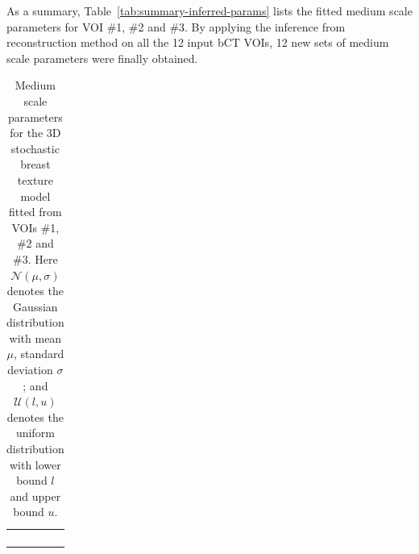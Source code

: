 \documentclass[journal]{IEEEtran}
\begin{document}
As a summary, Table~\ref{tab:summary-inferred-params} lists the fitted
medium scale parameters for VOI \#1, \#2 and \#3. By applying the
inference from reconstruction method on all the 12 input bCT VOIs, 12
new sets of medium scale parameters were finally obtained.

\begin{table}[!htb]
  {\fontsize{9}{8}\selectfont
    \begin{center}

      \caption{Medium scale parameters for the 3D stochastic breast
        texture model fitted from VOIs \#1, \#2 and \#3. Here
        $\mathcal{N}(\mu, \sigma)$ denotes the Gaussian distribution
        with mean $\mu$, standard deviation $\sigma$; and
        $\mathcal{U}(l,u)$ denotes the uniform distribution with lower
        bound $l$ and upper bound $u$.}

      \begin{tabular}{ m{1.6cm} m{1.8cm} m{1.8cm} m{1.8cm} }

        \toprule

        \centering{\textbf{Parameters}}
        & \centering{VOI \#1}
        & \centering{VOI \#2}
        & \centering{VOI \#3}
          \tabularnewline%

        \cmidrule(lr){1-1} \cmidrule(lr){2-2}
        \cmidrule(lr){3-3} \cmidrule(lr){4-4}

        \centering{$\kappa$ (\si{\per\mm\cubed})}
        & \centering{$3.24e-03$}
        & \centering{$3.41e-03$}
        & \centering{$2.87e-04$}
          \tabularnewline%

        \cmidrule(lr){1-1} \cmidrule(lr){2-2}
        \cmidrule(lr){3-3} \cmidrule(lr){4-4}

        \centering{$\lambda_0$ (\si{\per\mm\cubed})}
        & \centering{$5.98e-03$}
        & \centering{$1.92e-02$}
        & \centering{$3.09e-02$}
          \tabularnewline%

        \cmidrule(lr){1-1} \cmidrule(lr){2-2}
        \cmidrule(lr){3-3} \cmidrule(lr){4-4}

        \centering{$R$ (\si{\mm})}
        & \centering{$5.98$}
        & \centering{$3.85$}
        & \centering{$5.82$}
          \tabularnewline%

        \cmidrule(lr){1-1} \cmidrule(lr){2-2}
        \cmidrule(lr){3-3} \cmidrule(lr){4-4}


\end{tabular}
\end{center}}
\end{table}
\end{document}

